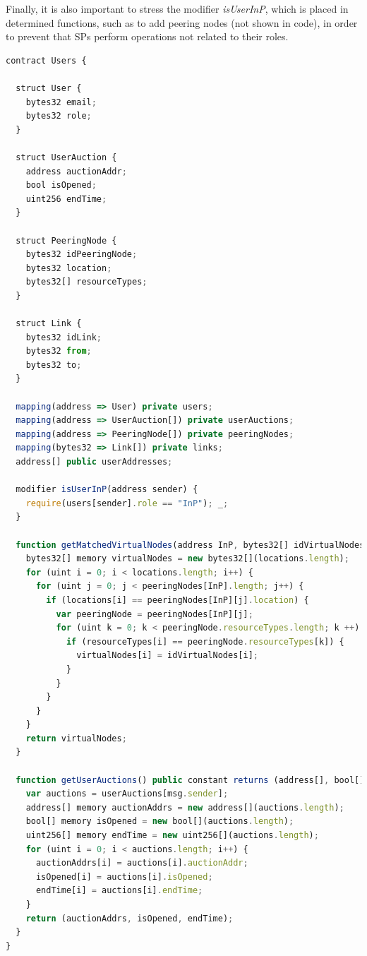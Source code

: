 Finally, it is also important to stress the modifier \textit{isUserInP}, which is placed in determined functions, such as to add peering nodes (not shown in code), in order to prevent that SPs perform operations not related to their roles. 

\begin{lstlisting}[language=JavaScript]
contract Users {

  struct User {
    bytes32 email;
    bytes32 role;
  }
  
  struct UserAuction {
    address auctionAddr;
    bool isOpened;
    uint256 endTime;
  }
  
  struct PeeringNode {
    bytes32 idPeeringNode;
    bytes32 location;
    bytes32[] resourceTypes;
  }
  
  struct Link {
    bytes32 idLink;
    bytes32 from;
    bytes32 to;
  }

  mapping(address => User) private users;
  mapping(address => UserAuction[]) private userAuctions;
  mapping(address => PeeringNode[]) private peeringNodes;
  mapping(bytes32 => Link[]) private links;
  address[] public userAddresses;
  
  modifier isUserInP(address sender) {
    require(users[sender].role == "InP"); _;
  }

  function getMatchedVirtualNodes(address InP, bytes32[] idVirtualNodes, bytes32[] locations, bytes32[] resourceTypes) public constant returns (bytes32[]) {
    bytes32[] memory virtualNodes = new bytes32[](locations.length);
    for (uint i = 0; i < locations.length; i++) {
      for (uint j = 0; j < peeringNodes[InP].length; j++) {
        if (locations[i] == peeringNodes[InP][j].location) {
          var peeringNode = peeringNodes[InP][j];
          for (uint k = 0; k < peeringNode.resourceTypes.length; k ++) {
            if (resourceTypes[i] == peeringNode.resourceTypes[k]) {
              virtualNodes[i] = idVirtualNodes[i];
            }
          }
        }
      }
    }
    return virtualNodes;
  }

  function getUserAuctions() public constant returns (address[], bool[], uint256[]) {
    var auctions = userAuctions[msg.sender];
    address[] memory auctionAddrs = new address[](auctions.length);
    bool[] memory isOpened = new bool[](auctions.length);
    uint256[] memory endTime = new uint256[](auctions.length);
    for (uint i = 0; i < auctions.length; i++) {
      auctionAddrs[i] = auctions[i].auctionAddr;
      isOpened[i] = auctions[i].isOpened;
      endTime[i] = auctions[i].endTime;
    }
    return (auctionAddrs, isOpened, endTime);
  }
}
\end{lstlisting}

